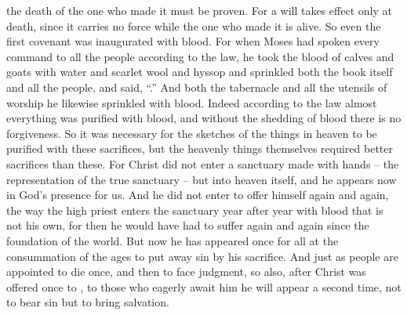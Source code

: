 {the death
of the one who made it
must
be proven.
For
a will
takes effect
only at
death,
since
it carries no
force
while
the one who made
it is alive.
So even
the first covenant
was inaugurated
with
blood.
For
when
Moses
had spoken
every
command
to all
the people
according to
the law,
he took
the blood
of calves
and
goats
with
water
and
scarlet
wool
and
hyssop
and sprinkled
both
the book
itself and
all
the people,
and said, “{}.”
And
both
the tabernacle
and
all
the utensils
of worship
he
likewise
sprinkled
with blood.
Indeed according to
the law
almost
everything
was purified
with
blood,
and
without
the shedding of blood
there is
no
forgiveness.
So
it was necessary
for the sketches of the things
in
heaven
to be purified
with these sacrifices,
but
the heavenly things
themselves
required better
sacrifices
than
these.
For
Christ
did
not
enter
a sanctuary
made with hands
– the representation
of the true sanctuary –
but
into
heaven
itself,
and he appears
now
in God’s
presence
for
us.
And
he did not
enter to offer
himself
again and again,
the way the high priest
enters
the sanctuary
year after year
with
blood
that is not his own,
for then
he
would have had
to suffer
again and again
since
the foundation
of
the world.
But
now
he has appeared
once for all
at
the consummation
of the ages
to
put away
sin
by
his sacrifice.
And
just as
people
are appointed
to die
once,
and
then
to face judgment,
so
also,
after
Christ
was offered
once
to
{}, to those who eagerly await
him he will appear
a second time,
not
to bear sin
but to
bring salvation.

}
